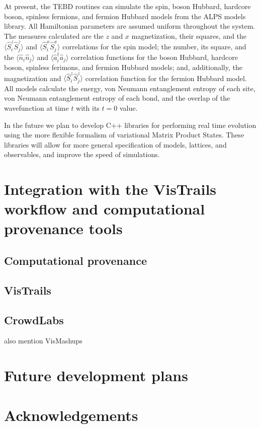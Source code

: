 \documentclass[12pt]{iopart}
\begin{document}
At present, the TEBD routines can simulate the spin, boson Hubbard, hardcore boson, spinless fermions, and fermion Hubbard models from the ALPS models library.  All Hamiltonian parameters are assumed uniform throughout the system.  The measures calculated are the $z$ and $x$ magnetization, their squares, and the $\langle \hat{S}^z_i \hat{S}^z_j\rangle$ and $\langle \hat{S}^x_i \hat{S}^x_j\rangle$ correlations for the spin model; the number, its square, and the $\langle \hat{n}_i \hat{n}_j\rangle$ and $\langle \hat{a}_i^{\dagger} \hat{a}_j\rangle$ correlation functions for the boson Hubbard, hardcore boson, spinless ferimons, and fermion Hubbard models; and, additionally, the magnetization and $\langle \hat{S}^z_i \hat{S}^z_j\rangle$ correlation function for the fermion Hubbard model.  All models calculate the energy, von Neumann entanglement entropy of each site, von Neumann entanglement entropy of each bond, and the overlap of the wavefunction at time $t$ with its $t=0$ value.

In the future we plan to develop C++ libraries for performing real time evolution using the more flexible formalism of variational Matrix Product States.  These libraries will allow for more general specification of models, lattices, and observables, and improve the speed of simulations. 


\section{Integration with the VisTrails workflow and computational provenance tools}
\subsection{Computational provenance}
\subsection{VisTrails}
\subsection{CrowdLabs}
also mention VisMashups
\section{Future development plans}
\section{Acknowledgements}
\end{document}
